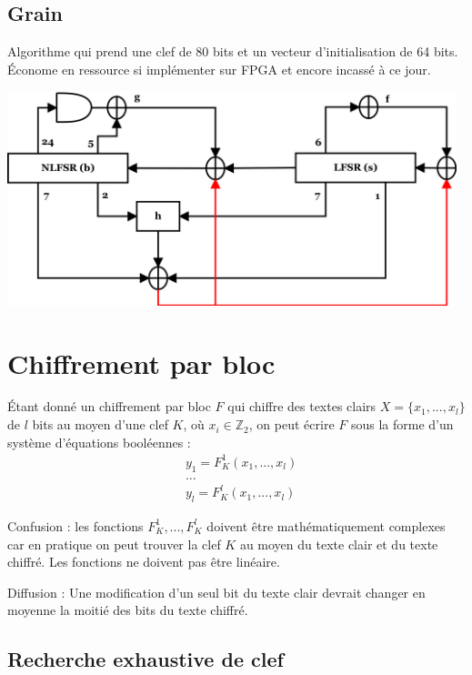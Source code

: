 \documentclass[11pt,a4paper]{report}
\begin{document}
\subsection{Grain}

Algorithme qui prend une clef de 80 bits et un vecteur d'initialisation de 64 bits. Économe en ressource si implémenter sur FPGA et encore incassé à ce jour.

\begin{center}
\includegraphics[width=0.98\textwidth]{img/Grain_init.png}
\end{center}

\section{Chiffrement par bloc}

Étant donné un chiffrement par bloc $F$ qui chiffre des textes clairs $X = \{x_1,...,x_l\}$ de $l$ bits au moyen d'une clef $K$, où $x_i \in \mathbb{Z}_2$, on peut écrire $F$ sous la forme d'un système d'équations booléennes :
\begin{align*}
&y_1 = F^1_K(x_1,...,x_l) \\
&... \\
&y_l = F^l_K(x_1,...,x_l)
\end{align*}

Confusion : les fonctions $F^1_K,...,F^l_K$ doivent être mathématiquement complexes car en pratique on peut trouver la clef $K$ au moyen du texte clair et du texte chiffré. Les fonctions ne doivent pas être linéaire.

Diffusion : Une modification d'un seul bit du texte clair devrait changer en moyenne la moitié des bits du texte chiffré.

\subsection{Recherche exhaustive de clef}
\end{document}
